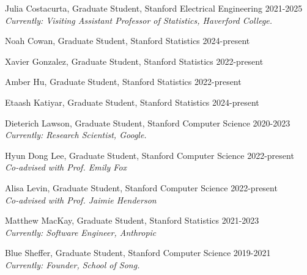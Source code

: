 \documentclass[10pt]{article}
\renewcommand{\section}[1]{\pagebreak[3]%
    \hyphenpenalty=10000%
    \vspace{1.3\baselineskip}%
    \noindent\llap{\scshape\smash{\parbox[t]{\marginparwidth}{\raggedright #1}}}%
    \vspace{-\baselineskip}\par}
\newcommand{\blankline}{\quad\pagebreak[3]}
\begin{document}
\blankline


\section{Student\\Advising}

\begin{outerlist}
  
\item Julia Costacurta, Graduate Student, Stanford Electrical Engineering \hfill {\small 2021-2025}
\\
\textit{Currently: Visiting Assistant Professor of Statistics, Haverford College.}

\item Noah Cowan, Graduate Student, Stanford Statistics \hfill {\small 2024-present}
  
\item Xavier Gonzalez, Graduate Student, Stanford Statistics \hfill {\small 2022-present}

\item Amber Hu, Graduate Student, Stanford Statistics \hfill {\small 2022-present}

\item Etaash Katiyar, Graduate Student, Stanford Statistics \hfill {\small 2024-present}

\item Dieterich Lawson, Graduate Student, Stanford Computer Science \hfill {\small 2020-2023} \\
\textit{Currently: Research Scientist, Google.}
  
\item Hyun Dong Lee, Graduate Student, Stanford Computer Science \hfill {\small 2022-present} \\
\textit{Co-advised with Prof. Emily Fox}
  
\item Alisa Levin, Graduate Student, Stanford Computer Science \hfill {\small 2022-present}
\\
\textit{Co-advised with Prof. Jaimie Henderson}

\item Matthew MacKay, Graduate Student, Stanford Statistics \hfill {\small 2021-2023}
\\
\textit{Currently: Software Engineer, Anthropic}
  
\item Blue Sheffer, Graduate Student, Stanford Computer Science \hfill {\small 2019-2021}
\\
\textit{Currently: Founder, School of Song.}


\end{outerlist}
\end{document}
